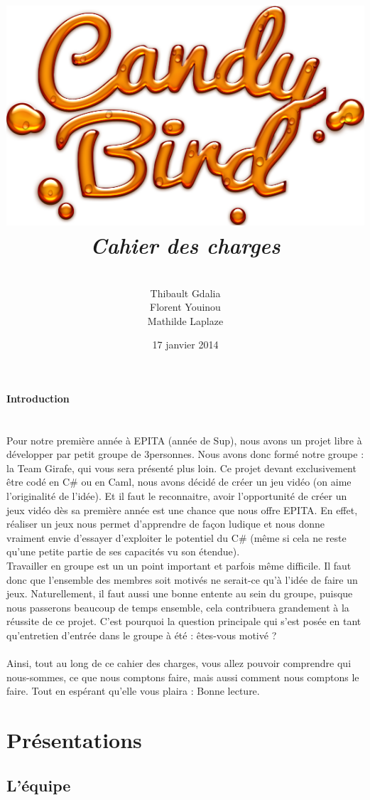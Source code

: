 \documentclass [11pt]{report}
\title{
	\includegraphics[scale=0.43]{images/Logojeu.png}
	 \\\vspace{20mm}
	\textbf{\Huge \itshape Cahier des charges }
	}
\author{ \\\vspace{2mm}
	Thibault Gdalia\\\vspace{2mm}
	Florent Youinou\\\vspace{2mm}
	Mathilde Laplaze\\\vspace{30mm}
	}
\date{17 janvier 2014}
\begin{document}
\renewcommand{\baselinestretch}{0.001}
\maketitle
\tableofcontents

\newpage


\textbf{{\Huge Introduction}}\\
\\
\\
		\indent Pour notre première année à EPITA (année de Sup), nous avons un projet libre à développer par petit groupe de 3personnes. Nous avons donc formé notre groupe : la Team Girafe, qui vous sera présenté plus loin. Ce projet devant exclusivement être codé en C\# ou en Caml, nous avons décidé de créer un jeu vidéo (on 		aime l'originalité de l'idée). Et il faut le reconnaitre, avoir l'opportunité de créer un jeux vidéo dès sa première année est une chance que nous offre EPITA. En effet, réaliser un jeux nous permet d'apprendre de façon ludique et nous donne vraiment envie d'essayer d'exploiter le potentiel du C\# (même si cela ne reste qu'une petite partie 		de ses capacités vu son étendue).\\

		\indent Travailler en groupe est un un point important et parfois même difficile. Il faut donc que l'ensemble des membres soit motivés ne serait-ce qu'à l'idée de faire un jeux. Naturellement, il faut aussi une bonne entente au sein du groupe, puisque nous passerons beaucoup de temps ensemble, cela contribuera grandement à la 			réussite de ce projet. C'est pourquoi la question principale qui s'est posée en tant qu'entretien d'entrée dans le groupe à été : êtes-vous motivé ?\\\\
		\indent Ainsi, tout au long de ce cahier des charges, vous allez pouvoir comprendre qui nous-sommes, ce que nous comptons faire, mais aussi comment nous comptons le faire. Tout en espérant qu'elle vous plaira : Bonne lecture.
		
\chapter {Pr\'esentations}

	\section{ L'\'equipe }
\end{document}
